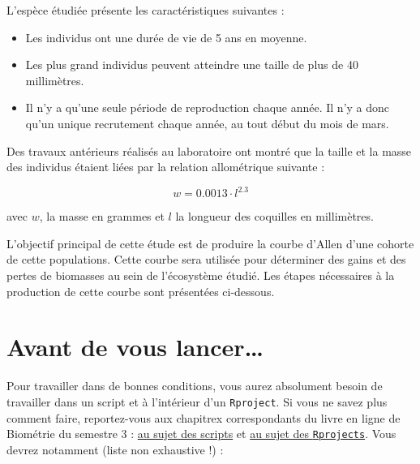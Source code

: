 \documentclass[
  a4paper,
  DIV=11,
  numbers=noendperiod,
  oneside]{scrreprt}
\providecommand{\tightlist}{%
  \setlength{\itemsep}{0pt}\setlength{\parskip}{0pt}}\usepackage{longtable,booktabs,array}
\begin{document}
L'espèce étudiée présente les caractéristiques suivantes :

\begin{itemize}
\tightlist
\item
  Les individus ont une durée de vie de 5 ans en moyenne.
\item
  Les plus grand individus peuvent atteindre une taille de plus de 40
  millimètres.
\item
  Il n'y a qu'une seule période de reproduction chaque année. Il n'y a
  donc qu'un unique recrutement chaque année, au tout début du mois de
  mars.
\end{itemize}

Des travaux antérieurs réalisés au laboratoire ont montré que la taille
et la masse des individus étaient liées par la relation allométrique
suivante :

\[w = 0.0013 \cdot l^{2.3}\]

avec \(w\), la masse en grammes et \(l\) la longueur des coquilles en
millimètres.

\begin{tcolorbox}[enhanced jigsaw, breakable, toprule=.15mm, colbacktitle=quarto-callout-important-color!10!white, colframe=quarto-callout-important-color-frame, arc=.35mm, bottomtitle=1mm, opacityback=0, title=\textcolor{quarto-callout-important-color}{\faExclamation}\hspace{0.5em}{Objectif principal}, bottomrule=.15mm, colback=white, toptitle=1mm, rightrule=.15mm, leftrule=.75mm, opacitybacktitle=0.6, left=2mm, titlerule=0mm, coltitle=black]

L'objectif principal de cette étude est de produire la courbe d'Allen
d'une cohorte de cette populations. Cette courbe sera utilisée pour
déterminer des gains et des pertes de biomasses au sein de l'écosystème
étudié. Les étapes nécessaires à la production de cette courbe sont
présentées ci-dessous.

\end{tcolorbox}

\hypertarget{avant-de-vous-lancer}{%
\section{Avant de vous lancer\ldots{}}\label{avant-de-vous-lancer}}

Pour travailler dans de bonnes conditions, vous aurez absolument besoin
de travailler dans un script et à l'intérieur d'un \texttt{Rproject}. Si
vous ne savez plus comment faire, reportez-vous aux chapitrex
correspondants du livre en ligne de Biométrie du semestre 3 :
\href{https://besibo.github.io/BiometrieS3/01-R-basics.html\#sec-script}{au
sujet des scripts} et
\href{https://besibo.github.io/BiometrieS3/01-R-basics.html\#les-projets-ou-rprojects}{au
sujet des \texttt{Rprojects}}. Vous devrez notamment (liste non
exhaustive !) :
\end{document}
